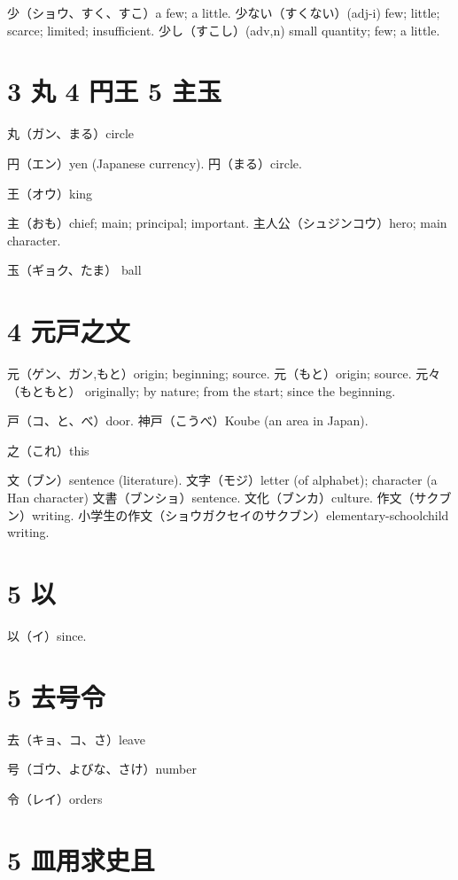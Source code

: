 少（ショウ、すく、すこ）a few; a little.
少ない（すくない）(adj-i) few; little; scarce; limited; insufficient.
少し（すこし）(adv,n) small quantity; few; a little.

\section{3 丸 4 円王 5 主玉}

丸（ガン、まる）circle

円（エン）yen (Japanese currency).
円（まる）circle.

王（オウ）king

主（おも）chief; main; principal; important.
主人公（シュジンコウ）hero; main character.

玉（ギョク、たま） ball

\section{4 元戸之文}

元（ゲン、ガン,もと）origin; beginning; source.
元（もと）origin; source.
元々（もともと）
originally; by nature; from the start; since the beginning.

戸（コ、と、べ）door.
神戸（こうべ）Koube (an area in Japan).

之（これ）this

文（ブン）sentence (literature).
文字（モジ）letter (of alphabet); character (a Han character)
文書（ブンショ）sentence.
文化（ブンカ）culture.
作文（サクブン）writing.
小学生の作文（ショウガクセイのサクブン）elementary-schoolchild writing.

\section{5 以}

以（イ）since.

\section{5 去号令}

去（キョ、コ、さ）leave

号（ゴウ、よびな、さけ）number

令（レイ）orders

\section{5 皿用求史且}

